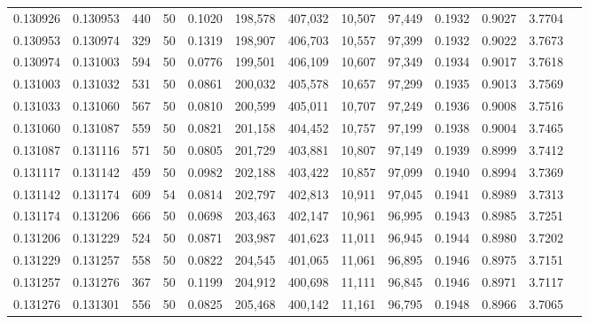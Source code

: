 \begin{tabular}{rrrrrrrrrrrrr}
0.130926 & 0.130953 &   440 &  50 &                                     0.1020 & 198,578 & 407,032 &  10,507 &  97,449 & 0.1932 & 0.9027 & 3.7704 \\
0.130953 & 0.130974 &   329 &  50 &                                     0.1319 & 198,907 & 406,703 &  10,557 &  97,399 & 0.1932 & 0.9022 & 3.7673 \\
0.130974 & 0.131003 &   594 &  50 &                                     0.0776 & 199,501 & 406,109 &  10,607 &  97,349 & 0.1934 & 0.9017 & 3.7618 \\
0.131003 & 0.131032 &   531 &  50 &                                     0.0861 & 200,032 & 405,578 &  10,657 &  97,299 & 0.1935 & 0.9013 & 3.7569 \\
0.131033 & 0.131060 &   567 &  50 &                                     0.0810 & 200,599 & 405,011 &  10,707 &  97,249 & 0.1936 & 0.9008 & 3.7516 \\
0.131060 & 0.131087 &   559 &  50 &                                     0.0821 & 201,158 & 404,452 &  10,757 &  97,199 & 0.1938 & 0.9004 & 3.7465 \\
0.131087 & 0.131116 &   571 &  50 &                                     0.0805 & 201,729 & 403,881 &  10,807 &  97,149 & 0.1939 & 0.8999 & 3.7412 \\
0.131117 & 0.131142 &   459 &  50 &                                     0.0982 & 202,188 & 403,422 &  10,857 &  97,099 & 0.1940 & 0.8994 & 3.7369 \\
0.131142 & 0.131174 &   609 &  54 &                                     0.0814 & 202,797 & 402,813 &  10,911 &  97,045 & 0.1941 & 0.8989 & 3.7313 \\
0.131174 & 0.131206 &   666 &  50 &                                     0.0698 & 203,463 & 402,147 &  10,961 &  96,995 & 0.1943 & 0.8985 & 3.7251 \\
0.131206 & 0.131229 &   524 &  50 &                                     0.0871 & 203,987 & 401,623 &  11,011 &  96,945 & 0.1944 & 0.8980 & 3.7202 \\
0.131229 & 0.131257 &   558 &  50 &                                     0.0822 & 204,545 & 401,065 &  11,061 &  96,895 & 0.1946 & 0.8975 & 3.7151 \\
0.131257 & 0.131276 &   367 &  50 &                                     0.1199 & 204,912 & 400,698 &  11,111 &  96,845 & 0.1946 & 0.8971 & 3.7117 \\
0.131276 & 0.131301 &   556 &  50 &                                     0.0825 & 205,468 & 400,142 &  11,161 &  96,795 & 0.1948 & 0.8966 & 3.7065 \\

\end{tabular}

